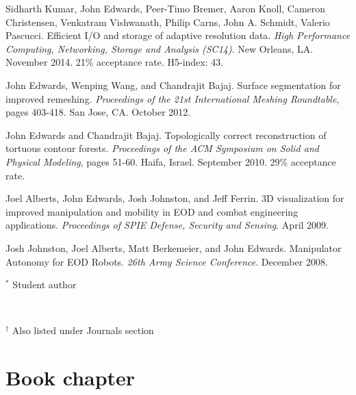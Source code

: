 \documentclass[margin,line]{res}
\newcommand{\pubunder}[1]{#1}
\begin{document}
\begin{resume}
Sidharth Kumar, \pubunder{John Edwards}, Peer-Timo Bremer, Aaron Knoll, Cameron Christensen, Venkatram Vishwanath, Philip Carns, John A. Schmidt, Valerio Pascucci. Efficient I/O and storage of adaptive resolution data. \textit{High Performance Computing, Networking, Storage and Analysis (SC14)}. New Orleans, LA. November 2014. 21\% acceptance rate. H5-index: 43.

\pubunder{John Edwards}, Wenping Wang, and Chandrajit Bajaj. Surface segmentation for improved remeshing. \textit{Proceedings of the 21st International Meshing Roundtable}, pages 403-418. San Jose, CA. October 2012.

\pubunder{John Edwards} and Chandrajit Bajaj. Topologically correct reconstruction of tortuous contour forests. \textit{Proceedings of the ACM Symposium on Solid and Physical Modeling}, pages 51-60. Haifa, Israel. September 2010. 29\% acceptance rate.

Joel Alberts, \pubunder{John Edwards}, Josh Johnston, and Jeff Ferrin. 3D visualization for improved manipulation and mobility in EOD and combat engineering applications. \textit{Proceedings of SPIE Defense, Security and Sensing}. April 2009.

Josh Johnston, Joel Alberts, Matt Berkemeier, and \pubunder{John Edwards}. Manipulator Autonomy for EOD Robots. \textit{26th Army Science Conference}. December 2008.


\begin{footnotesize}$^*$ Student author\end{footnotesize}
\\\begin{footnotesize}$^\dagger$ Also listed under Journals section\end{footnotesize}

\section{\sc Book chapter}


\end{resume}
\end{document}
